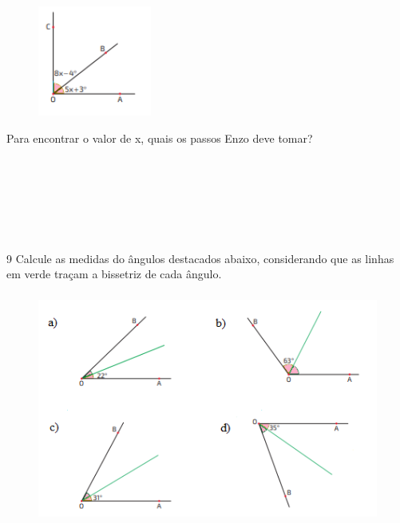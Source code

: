 \begin{figure}[H]
\centering\includegraphics[width=1.47134in,height=1.42708in]{./imgSAEB_8_MAT/media/image31.png}
\end{figure}

Para encontrar o valor de x, quais os passos Enzo deve tomar?

\\
\\
\\
\\
\\
\\

\num{9} Calcule as medidas do ângulos destacados abaixo, considerando que as
linhas em verde traçam a bissetriz de cada ângulo.

\begin{figure}[H]
\centering\includegraphics[width=4.66667in,height=3in]{./imgSAEB_8_MAT/media/image32.png}
\end{figure}

\\

